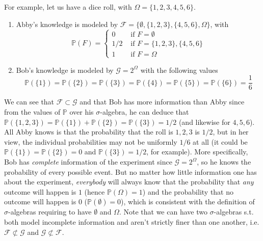     For example, let us have a dice roll, with $\Omega = \{1, 2, 3, 4, 5, 6\}$.
    \begin{enumerate}
      \item Abby's knowledge is modeled by $\mathcal{F} = \{\emptyset, \{1, 2, 3\}, \{4, 5, 6\}, \Omega\}$, with 
      \begin{equation}
        \mathbb{P}(F) = \begin{cases} 
          0 & \text{ if } F = \emptyset \\
          1/2 & \text{ if } F = \{1, 2, 3\}, \{4, 5, 6\} \\ 
          1 & \text{ if } F = \Omega \end{cases}
      \end{equation}
      \item Bob's knowledge is modeled by $\mathcal{G} = 2^\Omega$ with the following values 
      \begin{equation}
        \mathbb{P}(\{1\}) = \mathbb{P}(\{2\}) = \mathbb{P}(\{3\}) = \mathbb{P}(\{4\}) = \mathbb{P}(\{5\}) = \mathbb{P}(\{6\}) = \frac{1}{6}
      \end{equation}
    \end{enumerate}
    We can see that $\mathcal{F} \subset \mathcal{G}$ and that Bob has more information than Abby since from the values of $\mathbb{P}$ over his $\sigma$-algebra, he can deduce that $\mathbb{P}(\{1, 2, 3\}) = \mathbb{P}(\{1\}) + \mathbb{P}(\{2\}) = \mathbb{P}(\{3\}) = 1/2$ (and likewise for $4, 5, 6$). All Abby knows is that the probability that the roll is $1, 2, 3$ is $1/2$, but in her view, the individual probabilities may not be uniformly $1/6$ at all (it could be $\mathbb{P}(\{1\}) = \mathbb{P}(\{2\}) = 0$ and $\mathbb{P}(\{3\}) = 1/2$, for example). More specifically, Bob has \textit{complete} information of the experiment since $\mathcal{G} = 2^\Omega$, so he knows the probability of every possible event. But no matter how little information one has about the experiment, \textit{everybody} will always know that the probability that \textit{any} outcome will happen is $1$ (hence $\mathbb{P}(\Omega) = 1$) and the probability that no outcome will happen is $0$ ($\mathbb{P}(\emptyset) = 0$), which is consistent with the definition of $\sigma$-algebras requiring to have $\emptyset$ and $\Omega$. Note that we can have two $\sigma$-algebras s.t. both model incomplete information and aren't strictly finer than one another, i.e. $\mathcal{F} \not\subset \mathcal{G}$ and $\mathcal{G} \not\subset \mathcal{F}$. 


